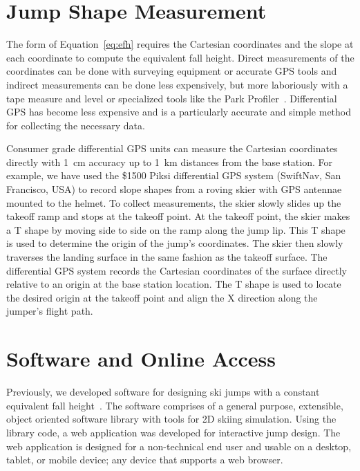 \documentclass{article}
\begin{document}
\section{Jump Shape Measurement}
%
The form of Equation~\ref{eq:efh} requires the Cartesian coordinates and the
slope at each coordinate to compute the equivalent fall height. Direct
measurements of the coordinates can be done with surveying equipment or
accurate GPS tools and indirect measurements can be done less expensively, but
more laboriously with a tape measure and level or specialized tools like the
Park Profiler~. Differential GPS has become less expensive
and is a particularly accurate and simple method for collecting the necessary
data.

Consumer grade differential GPS units can measure the Cartesian coordinates
directly with 1~\si{\centi\meter} accuracy up to 1~\si{\kilo\meter} distances
from the base station. For example, we have used the \$1500 Piksi differential
GPS system (SwiftNav, San Francisco, USA) to record slope shapes from a roving
skier with GPS antennae mounted to the helmet. To collect measurements, the
skier slowly slides up the takeoff ramp and stops at the takeoff point. At the
takeoff point, the skier makes a T shape by moving side to side on the ramp
along the jump lip. This T shape is used to determine the origin of the jump's
coordinates. The skier then slowly traverses the landing surface in the same
fashion as the takeoff surface. The differential GPS system records the
Cartesian coordinates of the surface directly relative to an origin at the base
station location. The T shape is used to locate the desired origin at the
takeoff point and align the X direction along the jumper's flight path.

\section{Software and Online Access}
%
Previously, we developed software for designing ski jumps with a constant
equivalent fall height~\cite{Moore2018}. The software comprises of a general
purpose, extensible, object oriented software library with tools for 2D skiing
simulation. Using the library code, a web application was developed for
interactive jump design. The web application is designed for a non-technical
end user and usable on a desktop, tablet, or mobile device; any device that
supports a web browser.
\end{document}
